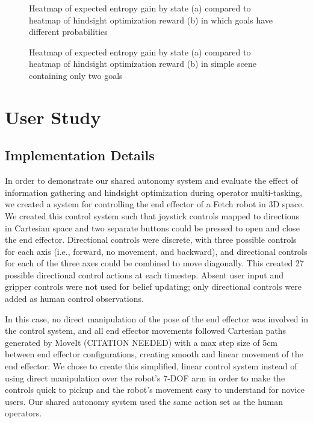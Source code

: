\documentclass[conference]{IEEEtran}
\begin{document}
\begin{figure}
\caption{Heatmap of expected entropy gain by state (a) compared to heatmap of hindsight optimization reward (b) in which goals have different probabilities}
\label{heatmap2}
\end{figure}

\begin{figure}
\caption{Heatmap of expected entropy gain by state (a) compared to heatmap of hindsight optimization reward (b) in simple scene containing only two goals}
\label{heatmap3}
\end{figure}

\section{User Study}

\subsection{Implementation Details}\label{implementation}
In order to demonstrate our shared autonomy system and evaluate the effect of information gathering and hindsight optimization during operator multi-tasking, we created a system for controlling the end effector of a Fetch robot in 3D space. We created this control system such that joystick controls mapped to directions in Cartesian space and two separate buttons could be pressed to open and close the end effector. Directional controls were discrete, with three possible controls for each axis (i.e., forward, no movement, and backward), and directional controls for each of the three axes could be combined to move diagonally. This created 27 possible directional control actions at each timestep. Absent user input and gripper controls were not used for belief updating; only directional controls were added as human control observations.

In this case, no direct manipulation of the pose of the end effector was involved in the control system, and all end effector movements followed Cartesian paths generated by MoveIt (CITATION NEEDED) with a max step size of 5cm between end effector configurations, creating smooth and linear movement of the end effector. We chose to create this simplified, linear control system instead of using direct manipulation over the robot's 7-DOF arm in order to make the controls quick to pickup and the robot's movement easy to understand for novice users. Our shared autonomy system used the same action set as the human operators.
\end{document}
